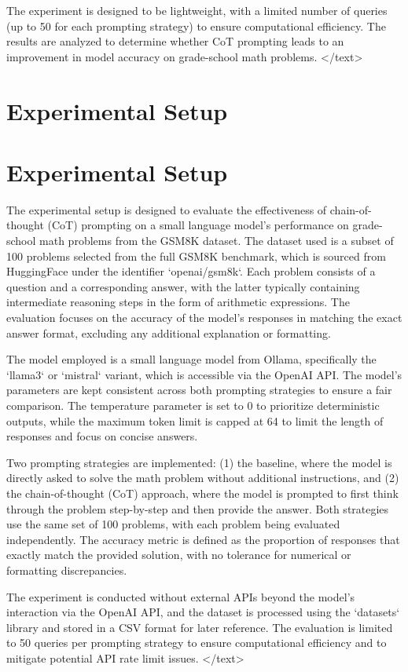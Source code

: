 \documentclass{article}
\begin{document}
The experiment is designed to be lightweight, with a limited number of queries (up to 50 for each prompting strategy) to ensure computational efficiency. The results are analyzed to determine whether CoT prompting leads to an improvement in model accuracy on grade-school math problems.
</text>
\section{Experimental Setup}
\section{Experimental Setup}

The experimental setup is designed to evaluate the effectiveness of chain-of-thought (CoT) prompting on a small language model's performance on grade-school math problems from the GSM8K dataset. The dataset used is a subset of 100 problems selected from the full GSM8K benchmark, which is sourced from HuggingFace under the identifier `openai/gsm8k`. Each problem consists of a question and a corresponding answer, with the latter typically containing intermediate reasoning steps in the form of arithmetic expressions. The evaluation focuses on the accuracy of the model's responses in matching the exact answer format, excluding any additional explanation or formatting.

The model employed is a small language model from Ollama, specifically the `llama3` or `mistral` variant, which is accessible via the OpenAI API. The model's parameters are kept consistent across both prompting strategies to ensure a fair comparison. The temperature parameter is set to 0 to prioritize deterministic outputs, while the maximum token limit is capped at 64 to limit the length of responses and focus on concise answers.

Two prompting strategies are implemented: (1) the baseline, where the model is directly asked to solve the math problem without additional instructions, and (2) the chain-of-thought (CoT) approach, where the model is prompted to first think through the problem step-by-step and then provide the answer. Both strategies use the same set of 100 problems, with each problem being evaluated independently. The accuracy metric is defined as the proportion of responses that exactly match the provided solution, with no tolerance for numerical or formatting discrepancies.

The experiment is conducted without external APIs beyond the model's interaction via the OpenAI API, and the dataset is processed using the `datasets` library and stored in a CSV format for later reference. The evaluation is limited to 50 queries per prompting strategy to ensure computational efficiency and to mitigate potential API rate limit issues.
</text>
\end{document}
